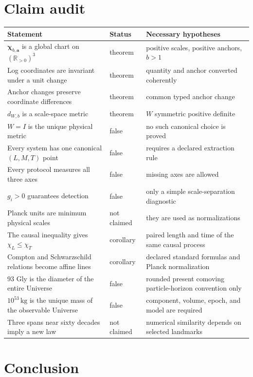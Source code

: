 \documentclass[11pt,a4paper]{article}
\theoremstyle{definition}
\theoremstyle{plain}
\theoremstyle{remark}
\newcommand{\Rpos}{\mathbb{R}_{>0}}
\begin{document}
\section{Claim audit}

\begin{longtable}{L{0.43\textwidth}L{0.19\textwidth}L{0.28\textwidth}}
\toprule
Statement & Status & Necessary hypotheses\\
\midrule
\endhead
$\bm\chi_{b,\bm a}$ is a global chart on $(\Rpos)^3$ & theorem &
positive scales, positive anchors, $b>1$\\
Log coordinates are invariant under a unit change & theorem & quantity
and anchor converted coherently\\
Anchor changes preserve coordinate differences & theorem & common typed
anchor change\\
$d_{W,b}$ is a scale-space metric & theorem & $W$ symmetric positive
definite\\
$W=I$ is the unique physical metric & false & no such canonical choice
is proved\\
Every system has one canonical $(L,M,T)$ point & false & requires a
declared extraction rule\\
Every protocol measures all three axes & false & missing axes are
allowed\\
$g_i>0$ guarantees detection & false & only a simple scale-separation
diagnostic\\
Planck units are minimum physical scales & not claimed & they are used as
normalizations\\
The causal inequality gives $\chi_L\leq\chi_T$ & corollary & paired
length and time of the same causal process\\
Compton and Schwarzschild relations become affine lines & corollary &
declared standard formulas and Planck normalization\\
$93$ Gly is the diameter of the entire Universe & false & rounded present
comoving particle-horizon convention only\\
$10^{53}\,\mathrm{kg}$ is the unique mass of the observable Universe &
false & component, volume, epoch, and model are required\\
Three spans near sixty decades imply a new law & not claimed & numerical
similarity depends on selected landmarks\\
\bottomrule
\end{longtable}

\section{Conclusion}
\end{document}
